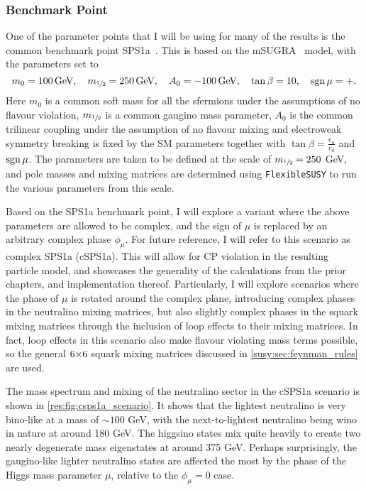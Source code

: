 \documentclass[../main.tex]{subfiles}
\begin{document}
\subsubsection*{Benchmark Point}
One of the parameter points that I will be using for many of the results is the common benchmark point SPS1a~\cite{sps1a}.
This is based on the mSUGRA~\cite{mSUGRA} model, with the parameters set to
\begin{equation}
  m_0 = 100\,\text{GeV},\quad m_{\sfrac{1}{2}} = 250\,\text{GeV},\quad A_0 = -100\,\text{GeV},\quad \tan\beta = 10,\quad \operatorname{sgn}{\mu} = +.
\end{equation}
Here \(m_0\) is a common soft mass for all the sfermions under the assumptions of no flavour violation, \(m_{\sfrac{1}{2}}\) is a common gaugino mass parameter, \(A_0\) is the common trilinear coupling under the assumption of no flavour mixing and electroweak symmetry breaking is fixed by the SM parameters together with \(\tan\beta = \frac{v_u}{v_d}\) and \(\operatorname{sgn}{\mu}\).
The parameters are taken to be defined at the scale of \(m_{\sfrac{1}{2}} = 250\) GeV, and pole masses and mixing matrices are determined using \verb|FlexibleSUSY| to run the various parameters from this scale.
\medskip

Based on the SPS1a benchmark point, I will explore a variant where the above parameters are allowed to be complex, and the sign of \(\mu\) is replaced by an arbitrary complex phase \(\phi_\mu\).
For future reference, I will refer to this scenario as complex SPS1a (cSPS1a).
This will allow for CP violation in the resulting particle model, and showcases the generality of the calculations from the prior chapters, and implementation thereof.
Particularly, I will explore scenarios where the phase of \(\mu\) is rotated around the complex plane, introducing complex phases in the neutralino mixing matrices, but also slightly complex phases in the squark mixing matrices through the inclusion of loop effects to their mixing matrices.
In fact, loop effects in this scenario also make flavour violating mass terms possible, so the general \(6{\times} 6\) squark mixing matrices discussed in \cref{susy:sec:feynman_rules} are used.
\medskip

The mass spectrum and mixing of the neutralino sector in the cSPS1a scenario is shown in \cref{res:fig:csps1a_scenario}.
It shows that the lightest neutralino is very bino-like at a mass of \(\sim 100\) GeV, with the next-to-lightest neutralino being wino in nature at around 180 GeV.
The higgsino states mix quite heavily to create two nearly degenerate mass eigenstates at around 375 GeV.
Perhaps surprisingly, the gaugino-like lighter neutralino states are affected the most by the phase of the Higgs mass parameter \(\mu\), relative to the \(\phi_\mu = 0\) case.
\end{document}

